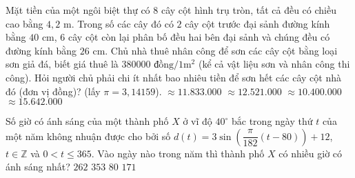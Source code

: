 \begin{ex}%
Mặt tiền của một ngôi biệt thự có $8$ cây cột hình trụ tròn, tất cả đều có chiều cao bằng $4{,}2$ m. Trong số các cây đó có $2$ cây cột trước đại sảnh đường kính bằng $40$ cm, $6$ cây cột còn lại phân bố đều hai bên đại sảnh và chúng đều có đường kính bằng $26$ cm. Chủ nhà thuê nhân công để sơn các cây cột bằng loại sơn giả đá, biết giá thuê là $380000$ $\text{đồng}/1\mathrm{m}^2$ (kể cả vật liệu sơn và nhân công thi công). Hỏi người chủ phải chi ít nhất bao nhiêu tiền để sơn hết các cây cột nhà đó (đơn vị đồng)? (lấy $\pi=3{,}14159$).
\choice
{\True $\approx 11.833.000$}
{$\approx 12.521.000$}
{$\approx 10.400.000$}
{$\approx 15.642.000$}
\end{ex}

\begin{ex}%
Số giờ có ánh sáng của một thành phố $X$ ở vĩ độ $40^\circ$ bắc trong ngày thứ $t$ của một năm không nhuận được cho bởi số $d(t)=3\sin\left(\dfrac{\pi}{182}(t-80)\right)+12$, $t\in\mathbb{Z}$ và $0<t\leq 365$. Vào ngày nào trong năm thì thành phố $X$ có nhiều giờ có ánh sáng nhất?
\choice
{$262$}
{$353$}
{$80$}
{\True $171$}
\end{ex}

